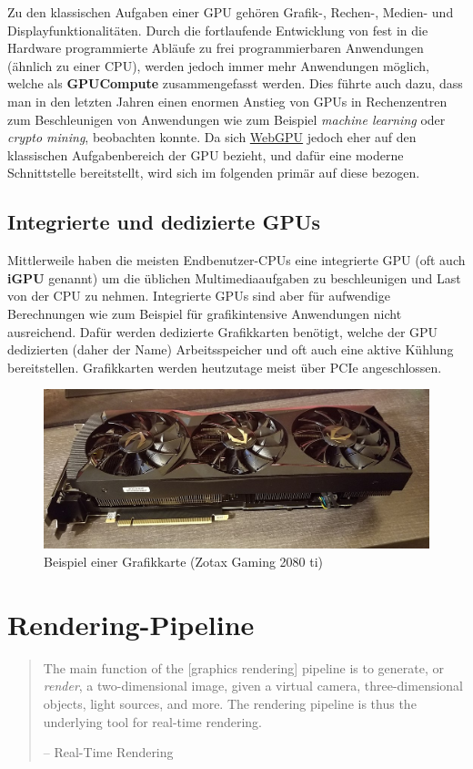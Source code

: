 \documentclass[oneside]{ausarbeitung}
\begin{document}
Zu den klassischen Aufgaben einer \ac{GPU} gehören Grafik-, Rechen-, Medien- und Displayfunktionalitäten. Durch die fortlaufende Entwicklung von fest in die Hardware programmierte Abläufe zu frei programmierbaren Anwendungen (ähnlich zu einer \ac{CPU}), werden jedoch immer mehr Anwendungen möglich, welche als \textbf{GPUCompute} zusammengefasst werden. Dies führte auch dazu, dass man in den letzten Jahren einen enormen Anstieg von \ac{GPU}s in Rechenzentren zum Beschleunigen von Anwendungen wie zum Beispiel \textit{machine learning} oder \textit{crypto mining}, beobachten konnte. Da sich \hyperref[cha:webgpu]{WebGPU} jedoch eher auf den klassischen Aufgabenbereich der \ac{GPU} bezieht, und dafür eine moderne Schnittstelle bereitstellt, wird sich im folgenden primär auf diese bezogen.

\subsection{Integrierte und dedizierte GPUs}
\label{sub:GPU_dedicated_integrated}
Mittlerweile haben die meisten Endbenutzer-\ac{CPU}s eine integrierte \ac{GPU} (oft auch \textbf{iGPU} genannt) um die üblichen Multimediaaufgaben zu beschleunigen und Last von der \ac{CPU} zu nehmen. Integrierte \ac{GPU}s sind aber für aufwendige Berechnungen wie zum Beispiel für grafikintensive Anwendungen nicht ausreichend. Dafür werden dedizierte Grafikkarten benötigt, welche der \ac{GPU} dedizierten (daher der Name) Arbeitsspeicher und oft auch eine aktive Kühlung bereitstellen. Grafikkarten werden heutzutage meist über \ac{PCIe} angeschlossen.

\begin{figure}
    \includegraphics[width=\textwidth]{images/1024px-Zotac_Gaming_GTX_2080_ti.jpg}
    \caption{Beispiel einer Grafikkarte (Zotax Gaming 2080 ti) \cite{2080_ti_graphics_card}}
    \label{fig:2080_ti_graphics_card}
\end{figure}

\section{Rendering-Pipeline \cite[Vgl.][The Graphics Rendering Pipeline]{real_time_rendering}}
\label{sec:render_pipeline}
\begin{quote}
The main function of the [graphics rendering] pipeline is to generate, or \textit{render}, a two-dimensional image, given a virtual camera, three-dimensional objects, light sources, and more. The rendering pipeline is thus the underlying tool for real-time rendering.

-- Real-Time Rendering \cite[S. 11]{real_time_rendering}
\end{quote}
\end{document}
